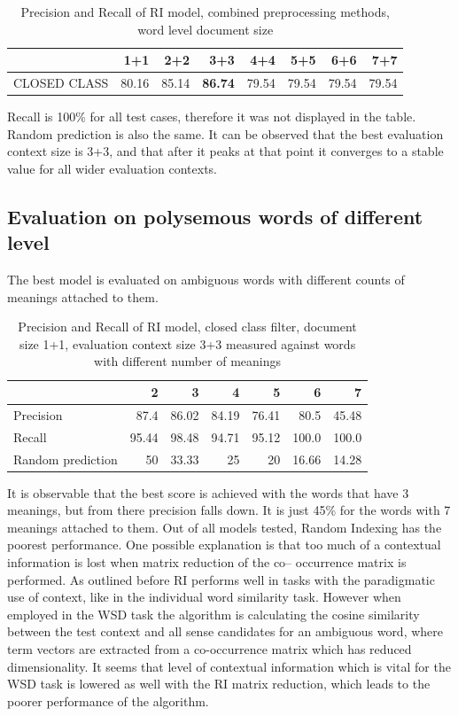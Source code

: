 \begin{table}[h!]
\begin{tabular}{ l | r r r r r r r}
    &  1+1 & 2+2 & 3+3 & 4+4 & 5+5 & 6+6 & 7+7 \\
\hline
CLOSED CLASS  & 80.16 & 85.14 & \textbf{86.74} & 79.54 & 79.54& 79.54& 79.54\\
\end{tabular}
\caption{Precision and Recall of RI model,  combined preprocessing methods, word level document size}
\end{table} 

Recall is 100\% for all test cases, therefore it was not displayed in the table. Random prediction is also the same. 
It can be observed that the best evaluation context size is 3+3, and that after it peaks at that point it converges to a stable value for all wider evaluation contexts. 



\subsection{Evaluation on polysemous words of different level}
The best model is evaluated on ambiguous words with 
different counts of meanings attached to them.

\begin{table}[h!]
\begin{tabular}{ l | r r r r r r}
     & 2 & 3 & 4 & 5 & 6& 7     \\
 \hline
Precision & 87.4 & 86.02 & 84.19 & 76.41 &80.5 & 45.48 \\
Recall   & 95.44 & 98.48 & 94.71 & 95.12 & 100.0 &100.0    \\
Random prediction    & 50 & 33.33 & 25 & 20 & 16.66 & 14.28      \\
\end{tabular}
\caption{Precision and Recall of RI model, closed class filter, document size 1+1, evaluation context size 3+3 measured against words with different number of meanings}
\end{table} 
 It is observable that the best score is achieved with the words that have 3 meanings, but from there precision falls down. It is 
just 45\% for the words with 7 meanings attached to them. Out of all models tested, Random Indexing has the poorest 
performance. One possible explanation is that too much of a contextual information is lost when matrix reduction of the co--
occurrence matrix is performed. As outlined before RI performs well in tasks with the paradigmatic use of context, like in the 
individual word similarity task. However when employed in the WSD task the algorithm is calculating the cosine similarity between the test 
context and all sense candidates for an ambiguous word, where term vectors are extracted from a co-occurrence matrix which has reduced dimensionality. 
It seems that level of contextual information which is vital for the WSD task is lowered as well with the RI matrix reduction, which leads to the poorer performance of the algorithm. 
